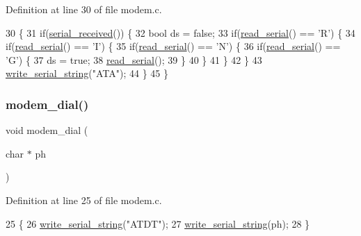 Definition at line 30 of file modem.\+c.


\begin{DoxyCode}
30                      \{
31     \textcolor{keywordflow}{if}(\hyperlink{a00050_af10f0e64ba89e8635aa7245ca08297c5_af10f0e64ba89e8635aa7245ca08297c5}{serial\_received}()) \{
32         \textcolor{keywordtype}{bool} ds = \textcolor{keyword}{false};
33         \textcolor{keywordflow}{if}(\hyperlink{a00050_ad343a7018f74662f794968dfa0523841_ad343a7018f74662f794968dfa0523841}{read\_serial}() == \textcolor{charliteral}{'R'}) \{
34             \textcolor{keywordflow}{if}(\hyperlink{a00050_ad343a7018f74662f794968dfa0523841_ad343a7018f74662f794968dfa0523841}{read\_serial}() == \textcolor{charliteral}{'I'}) \{
35                 \textcolor{keywordflow}{if}(\hyperlink{a00050_ad343a7018f74662f794968dfa0523841_ad343a7018f74662f794968dfa0523841}{read\_serial}() == \textcolor{charliteral}{'N'}) \{
36                     \textcolor{keywordflow}{if}(\hyperlink{a00050_ad343a7018f74662f794968dfa0523841_ad343a7018f74662f794968dfa0523841}{read\_serial}() == \textcolor{charliteral}{'G'}) \{
37                         ds = \textcolor{keyword}{true};
38                         \hyperlink{a00050_ad343a7018f74662f794968dfa0523841_ad343a7018f74662f794968dfa0523841}{read\_serial}();
39                     \}
40                 \}
41             \}
42         \}
43         \hyperlink{a00050_aabbe45d6670f606c53ba38a5fb14b650_aabbe45d6670f606c53ba38a5fb14b650}{write\_serial\_string}(\textcolor{stringliteral}{"ATA"});
44     \}
45 \}
\end{DoxyCode}
\mbox{\label{a00038_ab1123a026be8f7d0ece72e2813222da0_ab1123a026be8f7d0ece72e2813222da0}} 
\subsubsection{\texorpdfstring{modem\+\_\+dial()}{modem\_dial()}}
{\footnotesize\ttfamily void modem\+\_\+dial (\begin{DoxyParamCaption}\item[{char $\ast$}]{ph }\end{DoxyParamCaption})}



Definition at line 25 of file modem.\+c.


\begin{DoxyCode}
25                           \{
26     \hyperlink{a00050_aabbe45d6670f606c53ba38a5fb14b650_aabbe45d6670f606c53ba38a5fb14b650}{write\_serial\_string}(\textcolor{stringliteral}{"ATDT"});
27     \hyperlink{a00050_aabbe45d6670f606c53ba38a5fb14b650_aabbe45d6670f606c53ba38a5fb14b650}{write\_serial\_string}(ph);
28 \}
\end{DoxyCode}


